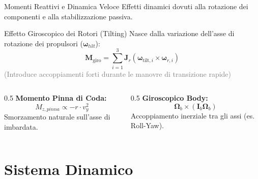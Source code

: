 \documentclass[aspectratio=169]{beamer} %
\begin{document}
\begin{frame}{Momenti Reattivi e Dinamica Veloce}
    Effetti dinamici dovuti alla rotazione dei componenti e alla stabilizzazione passiva.

    \begin{block}{Effetto Giroscopico dei Rotori (Tilting)}
        Nasce dalla variazione dell'asse di rotazione dei propulsori ($\bm{\omega}_{tilt}$):
        \begin{equation}
             \bm{M}_{\text{giro}} = \sum_{i=1}^{3} \mathbf{J}_{r} (\bm{\omega}_{\text{tilt},i} \times \bm{\omega}_{r,i})
        \end{equation}
        \footnotesize \textcolor{gray}{(Introduce accoppiamenti forti durante le manovre di transizione rapide)}
    \end{block}

    \vspace{0.3cm}
    \begin{columns}[c]
        \begin{column}{0.5\textwidth}
            \textbf{Momento Pinna di Coda:}
            \begin{equation*}
                M_{z, pinna} \propto -r \cdot v_y^2
            \end{equation*}
            Smorzamento naturale sull'asse di imbardata.
        \end{column}
        \begin{column}{0.5\textwidth}
             \textbf{Giroscopico Body:}
             \begin{equation*}
                 \bm{\Omega}_b \times (\mathbf{I}_b \bm{\Omega}_b)
             \end{equation*}
             Accoppiamento inerziale tra gli assi (es. Roll-Yaw).
        \end{column}
    \end{columns}
\end{frame}

\section{Sistema Dinamico}
\end{document}
